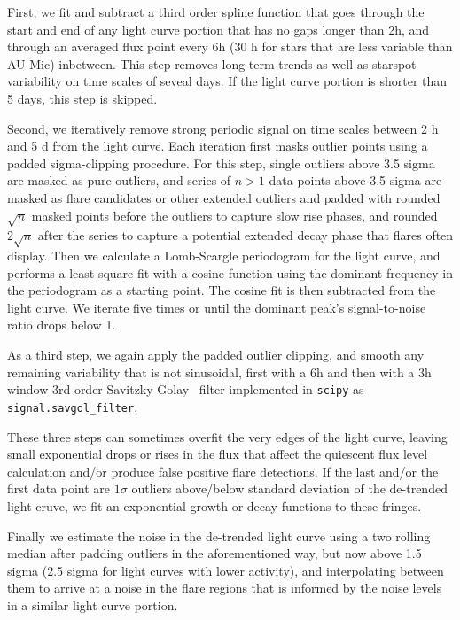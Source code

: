 \documentclass[fleqn,usenatbib,letters]{mnras}%
\begin{document}
First, we fit and subtract a third order spline function that goes through the start and end of any light curve portion that has no gaps longer than 2h, and through an averaged flux point every 6h (30 h for stars that are less variable than AU Mic) inbetween. This step removes long term trends as well as starspot variability on time scales of seveal days. If the light curve portion is shorter than 5 days, this step is skipped. 

Second, we iteratively remove strong periodic signal on time scales between 2 h and 5 d from the light curve. Each iteration first masks outlier points using a padded sigma-clipping procedure. For this step, single outliers above 3.5 sigma are masked as pure outliers, and series of $n>1$ data points above 3.5 sigma are masked as flare candidates or other extended outliers and padded with rounded $\sqrt{n}$ masked points before the outliers to capture slow rise phases, and rounded $2\sqrt{n}$ after the series to capture a potential extended decay phase that flares often display. Then we calculate a Lomb-Scargle periodogram for the light curve, and performs a least-square fit with a cosine function using the dominant frequency in the periodogram as a starting point. The cosine fit is then subtracted from the light curve. We iterate five times or until the dominant peak's signal-to-noise ratio drops below 1. 

As a third step, we again apply the padded outlier clipping, and smooth any remaining variability that is not sinusoidal, first with a 6h and then with a 3h window 3rd order Savitzky-Golay~\citep{savitzky1964} filter implemented in \texttt{scipy} as \texttt{signal.savgol\_filter}.

These three steps can sometimes overfit the very edges of the light curve, leaving small exponential drops or rises in the flux that affect the quiescent flux level calculation and/or produce false positive flare detections. If the last and/or the first data point are $1\sigma$ outliers above/below standard deviation of the de-trended light cruve, we fit an exponential growth or decay functions to these fringes.

Finally we estimate the noise in the de-trended light curve using a two rolling median after padding outliers in the aforementioned way, but now above 1.5 sigma (2.5 sigma for light curves with lower activity), and interpolating between them to arrive at a noise in the flare regions that is informed by the noise levels in a similar light curve portion.
\end{document}
